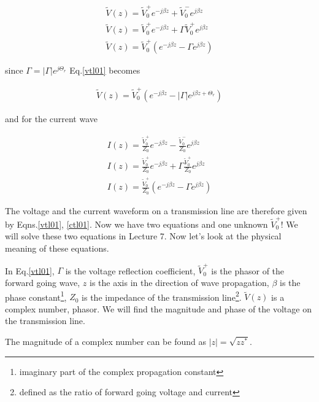 \documentclass{ximera}
\begin{document}
\begin{eqnarray}
\tilde{V}(z) = \tilde{V}_0^+ e^{-j \beta z} +\tilde{V}_0^- e^{j \beta z} \label{vtl11}\\
\tilde{V}(z) = \tilde{V}_0^+ e^{-j \beta z} + \Gamma  \tilde{V}_0^+ e^{j \beta z} \nonumber
\\
\tilde{V}(z)= \tilde{V}_0^+ (e^{-j \beta z} - \Gamma  e^{j \beta z}  ) \label{vtl01}
\end{eqnarray}

since $\Gamma = |\Gamma| e^{j \Theta_r}$ Eq.\ref{vtl01} becomes


\begin{eqnarray}
\tilde{V}(z)= \tilde{V}_0^+ (e^{-j \beta z} - |\Gamma|  e^{j \beta z + \Theta_r}  ) \label{vtl011}
\end{eqnarray}



and for the current wave



\begin{eqnarray}
I(z) = \frac{\tilde{V}_0^+}{Z_0} e^{-j \beta z} -  \frac{\tilde{V}_0^-}{Z_0} e^{j \beta z} \label{ctl1}\\
I(z) =  \frac{\tilde{V}_0^+}{Z_0}  e^{-j \beta z} + \Gamma \frac{\tilde{V}_0^+}{Z_0}  e^{j \beta z} \nonumber
\\
I(z)=   \frac{\tilde{V}_0^+}{Z_0}  (e^{-j \beta z} - \Gamma  e^{j \beta z}  ) \label{ctl01}
\end{eqnarray}

The voltage and the current waveform on a transmission line are
therefore given by Eqns.\ref{vtl01}, \ref{ctl01}. Now we have two
equations and one unknown $\tilde{V}_0^+$! We will solve these two equations
in Lecture 7. Now let's look at the physical meaning of these
equations.


In Eq.\ref{vtl01}, $\Gamma$ is the voltage reflection coefficient,
$\tilde{V}_0^+$ is the phasor of the forward going wave, $z$ is the axis in
the direction of wave propagation, $\beta$ is the phase
constant\footnote{imaginary part of the complex propagation constant},
$Z_0$ is the impedance of the transmission line\footnote{defined as
the ratio of forward going voltage and current}. $\tilde{V}(z)$ is a complex
number, phasor. We will find the magnitude and phase of the voltage on
the transmission line.




The magnitude of a complex number can be found as $|z|=\sqrt{z
z^*}$.
\end{document}
